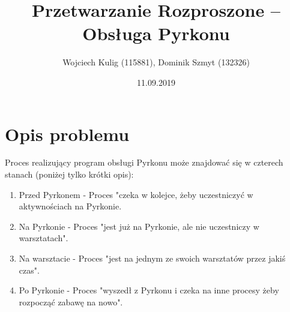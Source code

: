\documentclass[11pt]{article}
\title{Przetwarzanie Rozproszone -- Obsługa Pyrkonu}
\author{Wojciech Kulig (115881), Dominik Szmyt (132326)}
\date{11.09.2019}
\begin{document}
\maketitle

\section{Opis problemu}

Proces realizujący program obsługi Pyrkonu może znajdować się w czterech stanach (poniżej tylko krótki opis):
\begin{enumerate}
\item Przed Pyrkonem - Proces "czeka w kolejce, żeby uczestniczyć w aktywnościach na Pyrkonie.
\item Na Pyrkonie - Proces "jest już na Pyrkonie, ale nie uczestniczy w warsztatach".
\item Na warsztacie - Proces "jest na jednym ze swoich warsztatów przez jakiś czas".
\item Po Pyrkonie - Proces "wyszedł z Pyrkonu i czeka na inne procesy żeby rozpocząć zabawę na nowo". 
\end{enumerate}
\end{document}
